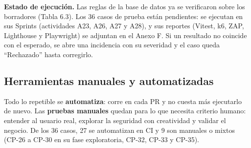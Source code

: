 \documentclass[11pt,a4paper]{article}
\begin{document}
\textbf{Estado de ejecución.} Las reglas de la base de datos ya se verificaron sobre los borradores (Tabla 6.3). Los 36 casos de prueba están pendientes: se ejecutan en sus Sprints (actividades A23, A26, A27 y A28), y sus reportes (Vitest, k6, ZAP, Lighthouse y Playwright) se adjuntan en el Anexo F. Si un resultado no coincide con el esperado, se abre una incidencia con su severidad y el caso queda ``Rechazado'' hasta corregirlo.

\subsection{Herramientas manuales y automatizadas}

Todo lo repetible se \textbf{automatiza}: corre en cada PR y no cuesta más ejecutarlo de nuevo. Las \textbf{pruebas manuales} quedan para lo que necesita criterio humano: entender al usuario real, explorar la seguridad con creatividad y validar el negocio. De los 36 casos, 27 se automatizan en CI y 9 son manuales o mixtos (CP-26 a CP-30 en su fase exploratoria, CP-32, CP-33 y CP-35).
\end{document}
